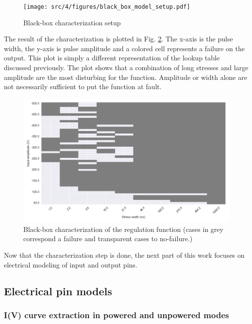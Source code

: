 \begin{figure}[!h]
  \centering
  \texttt{[image: src/4/figures/black\_box\_model\_setup.pdf]}
  \caption{Black-box characterization setup}
  \label{fig:cz-black-box-setup}
\end{figure}

The result of the characterization is plotted in Fig. \ref{fig:cz-black-box}.
The x-axis is the pulse width, the y-axis is pulse amplitude and a colored cell represents a failure on the output.
This plot is simply a different representation of the lookup table discussed previously.
The plot shows that a combination of long stresses and large amplitude are the most disturbing for the function.
Amplitude or width alone are not necessarily sufficient to put the function at fault.

\begin{figure}[!h]
  \centering
  \includegraphics[width=\textwidth]{src/4/figures/black_box_regulator.png}
  \caption{Black-box characterization of the regulation function (cases in grey correspond a failure and transparent cases to no-failure.)}
  \label{fig:cz-black-box}
\end{figure}

Now that the characterization step is done, the next part of this work focuses on electrical modeling of input and output pins.

\subsection{Electrical pin models}
\subsubsection{I(V) curve extraction in powered and unpowered modes}


